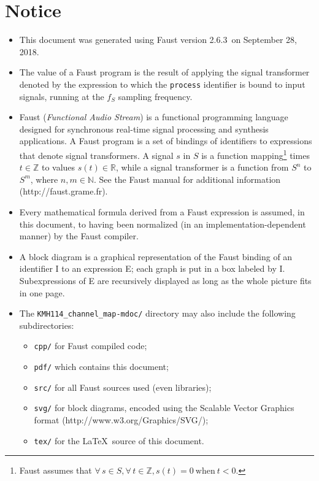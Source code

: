 \documentclass{article}
\newcommand{\faustdocdir}{KMH114\_channel\_map-mdoc}
\newcommand{\faustversion}{2.6.3}
\newcommand{\faustdocdate}{September 28, 2018}
\begin{document}
 \section{Notice} \label{notice}  
\begin{itemize}
	\item This document was generated using Faust version \faustversion\ on \faustdocdate.
	\item The value of a Faust program is the result of applying the signal transformer denoted by the expression to which the \texttt{process} identifier is bound to input signals, running at the $f_S$ sampling frequency.
	\item Faust (\emph{Functional Audio Stream}) is a functional programming language designed for synchronous real-time signal processing and synthesis applications. A Faust program is a set of bindings of identifiers to expressions that denote signal transformers. A signal $s$ in $S$ is a function mapping\footnote{Faust assumes that $\forall \, s \in S, \forall \, t \in \mathbb{Z}, s(t) = 0 \mathrm{\ when\ } t < 0$.} times $t \in \mathbb{Z}$ to values $s(t) \in \mathbb{R}$, while a signal transformer is a function from $S^n$ to $S^m$, where $n,m\in \mathbb{N}$. See the Faust manual for additional information (\textsf{http://faust.grame.fr}).
	\item Every mathematical formula derived from a Faust expression is assumed, in this document, to having been normalized (in an implementation-depen\-dent manner) by the Faust compiler.
	\item A block diagram is a graphical representation of the Faust binding of an identifier I to an expression E; each graph is put in a box labeled by I. Subexpressions of E are recursively displayed as long as the whole picture fits in one page.
	\item The \texttt{\faustdocdir/} directory may also include the following subdirectories:
\begin{itemize}
	\item	\texttt{cpp/} for Faust compiled code; 
	\item	\texttt{pdf/} which contains this document; 
	\item	\texttt{src/} for all Faust sources used (even libraries); 
	\item	\texttt{svg/} for block diagrams, encoded using the Scalable Vector Graphics format (\textsf{http://www.w3.org/Graphics/SVG/});
	\item	\texttt{tex/} for the \LaTeX\ source of this document.
\end{itemize}
\end{itemize}
\end{document}
